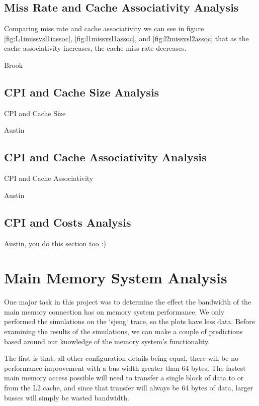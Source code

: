 \documentclass{article}
\begin{document}
\subsection{Miss Rate and Cache Associativity Analysis}

Comparing miss rate and cache associativity we can see in figure \ref{fig:L1imissvsl1iassoc}, \ref{fig:l1missvsl1assoc}, and \ref{fig:l2missvsl2assoc} that as the cache associativity increases, the cache miss rate decreases.

Brook

\subsection{CPI and Cache Size Analysis}

CPI and Cache Size

Austin

\subsection{CPI and Cache Associativity Analysis}

CPI and Cache Associativity

Austin

\subsection{CPI and Costs Analysis}

Austin, you do this section too :)

\section{Main Memory System Analysis}

One major task in this project was to determine the effect the bandwidth of the
main memory connection has on memory system performance. We only performed the
simulations on the `sjeng` trace, so the plots have less data. Before examining
the results of the simulations, we can make a couple of predictions based around
our knowledge of the memory system's functionality.

The first is that, all other configuration details being equal, there will be no
performance improvement with a bus width greater than 64 bytes. The fastest main
memory access possible will need to transfer a single block of data to or from
the L2 cache, and since that transfer will always be 64 bytes of data, larger
busses will simply be wasted bandwidth.
\end{document}
